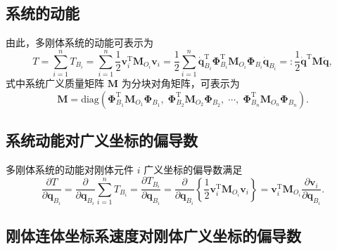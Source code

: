\subsection{系统的动能}

由此，多刚体系统的动能可表示为
\begin{equation}\label{eq:9.17}
  T = \sum_{i=1}^{n} T_{B_i} = \sum_{i=1}^{n} \frac{1}{2} \boldsymbol{v}_i^{\mathrm{T}} \boldsymbol{M}_{O_i} \boldsymbol{v}_i
  = \frac{1}{2} \sum_{i=1}^{n} \dot{\boldsymbol{q}}_{B_i}^{\mathrm{T}} \boldsymbol{\Phi}_{B_i}^{\mathrm{T}} \boldsymbol{M}_{O_i} \boldsymbol{\Phi}_{B_i} \dot{\boldsymbol{q}}_{B_i}
  =: \frac{1}{2} \dot{\boldsymbol{q}}^{\mathrm{T}} \boldsymbol{M} \dot{\boldsymbol{q}},
\end{equation}
式中系统广义质量矩阵 $\boldsymbol{M}$ 为分块对角矩阵，可表示为
\begin{equation}\label{eq:9.18}
  \boldsymbol{M} = \mathrm{diag}\left( \boldsymbol{\Phi}_{B_1}^{\mathrm{T}} \boldsymbol{M}_{O_1} \boldsymbol{\Phi}_{B_1},\; \boldsymbol{\Phi}_{B_2}^{\mathrm{T}} \boldsymbol{M}_{O_2} \boldsymbol{\Phi}_{B_2},\; \cdots,\; \boldsymbol{\Phi}_{B_n}^{\mathrm{T}} \boldsymbol{M}_{O_n} \boldsymbol{\Phi}_{B_n} \right).
\end{equation}

\subsection{系统动能对广义坐标的偏导数}

多刚体系统的动能对刚体元件 $i$ 广义坐标的偏导数满足
\begin{equation}\label{eq:9.19}
  \frac{\partial T}{\partial \boldsymbol{q}_{B_i}}
  = \frac{\partial}{\partial \boldsymbol{q}_{B_i}} \sum_{i=1}^{n} T_{B_i}
  = \frac{\partial T_{B_i}}{\partial \boldsymbol{q}_{B_i}}
  = \frac{\partial}{\partial \boldsymbol{q}_{B_i}} \left\{ \frac{1}{2} \boldsymbol{v}_i^{\mathrm{T}} \boldsymbol{M}_{O_i} \boldsymbol{v}_i \right\}
  = \boldsymbol{v}_i^{\mathrm{T}} \boldsymbol{M}_{O_i} \frac{\partial \boldsymbol{v}_i}{\partial \boldsymbol{q}_{B_i}}.
\end{equation}

\subsection{刚体连体坐标系速度对刚体广义坐标的偏导数}

